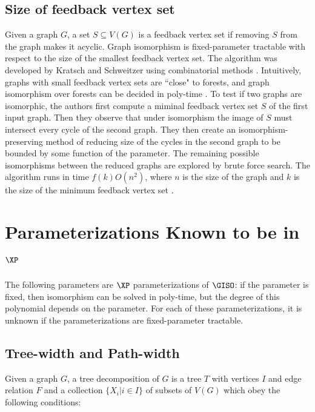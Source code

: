 \documentclass[11pt]{report}
\begin{document}
\subsection{Size of feedback vertex set}

Given a graph $G$, a set $S \subseteq V(G)$ is a feedback vertex set if removing $S$ from the graph makes it acyclic. Graph isomorphism is fixed-parameter tractable with respect to the size of the smallest feedback vertex set. The algorithm was developed by Kratsch and Schweitzer using combinatorial methods \cite{Kratsch09}. Intuitively, graphs with small feedback vertex sets are ``close" to forests, and graph isomorphism over forests can be decided in poly-time \cite{HopcroftWong74}. To test if two graphs are isomorphic, the authors first compute a miminal feedback vertex set $S$ of the first input graph. Then they observe that under isomorphism the image of $S$ must intersect every cycle of the second graph. They then create an isomorphism-preserving method of reducing size of the cycles in the second graph to be bounded by some function of the parameter. The remaining possible isomorphisms between the reduced graphs are explored by brute force search. The algorithm runs in time $f(k)O(n^2)$, where $n$ is the size of the graph and $k$ is the size of the minimum feedback vertex set \cite{Kratsch09}.










\section{Parameterizations Known to be in $\XP$}
\label{sec:XP_params}

The following parameters are $\XP$ parameterizations of $\GISO$: if the parameter is fixed, then isomorphism can be solved in poly-time, but the degree of this polynomial depends on the parameter. For each of these parameterizations, it is unknown if the parameterizations are fixed-parameter tractable.



\subsection{Tree-width and Path-width}

Given a graph $G$, a tree decomposition of $G$ is a tree $T$ with vertices $I$ and edge relation $F$ and a collection $\{ X_i | i \in I\}$ of subsets of $V(G)$ which obey the following conditions:
\end{document}
